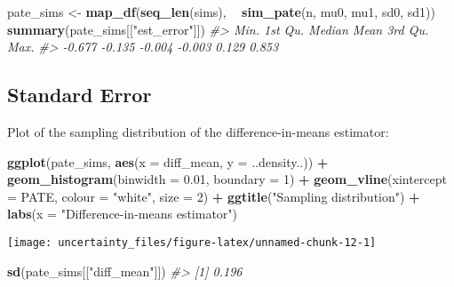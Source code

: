 \documentclass[]{book}
\newenvironment{Shaded}{\begin{snugshade}}{\end{snugshade}}
\newcommand{\CommentTok}[1]{\textcolor[rgb]{0.56,0.35,0.01}{\textit{#1}}}
\newcommand{\DataTypeTok}[1]{\textcolor[rgb]{0.13,0.29,0.53}{#1}}
\newcommand{\DecValTok}[1]{\textcolor[rgb]{0.00,0.00,0.81}{#1}}
\newcommand{\FloatTok}[1]{\textcolor[rgb]{0.00,0.00,0.81}{#1}}
\newcommand{\KeywordTok}[1]{\textcolor[rgb]{0.13,0.29,0.53}{\textbf{#1}}}
\newcommand{\NormalTok}[1]{#1}
\newcommand{\OperatorTok}[1]{\textcolor[rgb]{0.81,0.36,0.00}{\textbf{#1}}}
\newcommand{\StringTok}[1]{\textcolor[rgb]{0.31,0.60,0.02}{#1}}
\theoremstyle{definition}
\theoremstyle{definition}
\theoremstyle{definition}
\theoremstyle{remark}
\begin{document}
\begin{Shaded}
\begin{Highlighting}[]
\NormalTok{pate_sims <-}
\StringTok{  }\KeywordTok{map_df}\NormalTok{(}\KeywordTok{seq_len}\NormalTok{(sims), }\OperatorTok{~}\StringTok{ }\KeywordTok{sim_pate}\NormalTok{(n, mu0, mu1, sd0, sd1))}
\KeywordTok{summary}\NormalTok{(pate_sims[[}\StringTok{"est_error"}\NormalTok{]])}
\CommentTok{#>    Min. 1st Qu.  Median    Mean 3rd Qu.    Max. }
\CommentTok{#>  -0.677  -0.135  -0.004  -0.003   0.129   0.853}
\end{Highlighting}
\end{Shaded}

\hypertarget{standard-error}{%
\subsection{Standard Error}\label{standard-error}}

Plot of the sampling distribution of the difference-in-means estimator:

\begin{Shaded}
\begin{Highlighting}[]
\KeywordTok{ggplot}\NormalTok{(pate_sims, }\KeywordTok{aes}\NormalTok{(}\DataTypeTok{x =}\NormalTok{ diff_mean, }\DataTypeTok{y =}\NormalTok{ ..density..)) }\OperatorTok{+}
\StringTok{  }\KeywordTok{geom_histogram}\NormalTok{(}\DataTypeTok{binwidth =} \FloatTok{0.01}\NormalTok{, }\DataTypeTok{boundary =} \DecValTok{1}\NormalTok{) }\OperatorTok{+}
\StringTok{  }\KeywordTok{geom_vline}\NormalTok{(}\DataTypeTok{xintercept =}\NormalTok{ PATE, }\DataTypeTok{colour =} \StringTok{"white"}\NormalTok{, }\DataTypeTok{size =} \DecValTok{2}\NormalTok{) }\OperatorTok{+}
\StringTok{  }\KeywordTok{ggtitle}\NormalTok{(}\StringTok{"Sampling distribution"}\NormalTok{) }\OperatorTok{+}
\StringTok{  }\KeywordTok{labs}\NormalTok{(}\DataTypeTok{x =} \StringTok{"Difference-in-means estimator"}\NormalTok{)}
\end{Highlighting}
\end{Shaded}

\begin{center}\texttt{[image: uncertainty\_files/figure-latex/unnamed-chunk-12-1]} \end{center}

\begin{Shaded}
\begin{Highlighting}[]
\KeywordTok{sd}\NormalTok{(pate_sims[[}\StringTok{"diff_mean"}\NormalTok{]])}
\CommentTok{#> [1] 0.196}
\end{Highlighting}
\end{Shaded}
\end{document}
